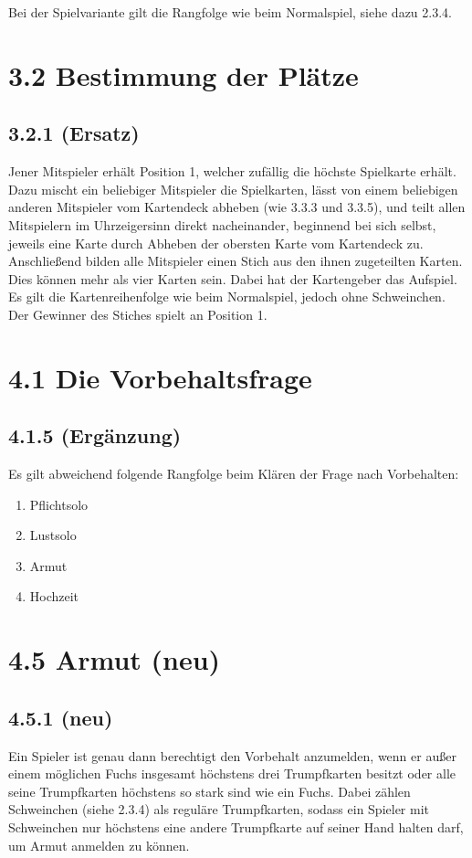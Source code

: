 Bei der Spielvariante  gilt die Rangfolge wie beim Normalspiel,
siehe dazu 2.3.4.

\section*{3.2 Bestimmung der Plätze}

\subsection*{3.2.1 (Ersatz)}

Jener Mitspieler erhält Position 1, welcher zufällig die höchste
Spielkarte erhält. Dazu mischt ein beliebiger Mitspieler die
Spielkarten, lässt von einem beliebigen anderen Mitspieler vom
Kartendeck abheben (wie 3.3.3 und 3.3.5), und teilt allen Mitspielern im
Uhrzeigersinn direkt nacheinander, beginnend bei sich selbst, jeweils
eine Karte durch Abheben der obersten Karte vom Kartendeck zu.
Anschließend bilden alle Mitspieler einen Stich aus den ihnen
zugeteilten Karten. Dies können mehr als vier Karten sein. Dabei hat
der Kartengeber das Aufspiel. Es gilt die Kartenreihenfolge wie beim
Normalspiel, jedoch ohne Schweinchen. Der Gewinner des Stiches spielt an
Position 1.

\section*{4.1 Die Vorbehaltsfrage}

\subsection*{4.1.5 (Ergänzung)}

Es gilt abweichend folgende Rangfolge beim Klären der Frage nach
Vorbehalten:

\begin{enumerate}
    \item Pflichtsolo
    \item Lustsolo
    \item Armut
    \item Hochzeit
\end{enumerate}

\section*{4.5 Armut (neu)}

\subsection*{4.5.1 (neu)}
 Ein Spieler ist genau dann berechtigt den Vorbehalt 
anzumelden, wenn er außer einem möglichen Fuchs insgesamt höchstens
drei Trumpfkarten besitzt oder alle seine Trumpfkarten höchstens so
stark sind wie ein Fuchs. Dabei zählen Schweinchen (siehe 2.3.4) als
reguläre Trumpfkarten, sodass ein Spieler mit Schweinchen nur
höchstens eine andere Trumpfkarte auf seiner Hand halten darf, um Armut
anmelden zu können.

